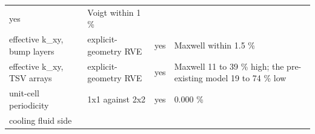 \documentclass[10pt,]{article}
\begin{document}
\begin{longtable}[]{@{}llll@{}}
\begin{minipage}[t]{0.22\columnwidth}
yes\strut
\end{minipage} & \begin{minipage}[t]{0.22\columnwidth}\raggedright
Voigt within 1 \%\strut
\end{minipage}\tabularnewline
\begin{minipage}[t]{0.22\columnwidth}\raggedright
effective k\_xy, bump layers\strut
\end{minipage} & \begin{minipage}[t]{0.22\columnwidth}\raggedright
explicit-geometry RVE\strut
\end{minipage} & \begin{minipage}[t]{0.22\columnwidth}\raggedright
yes\strut
\end{minipage} & \begin{minipage}[t]{0.22\columnwidth}\raggedright
Maxwell within 1.5 \%\strut
\end{minipage}\tabularnewline
\begin{minipage}[t]{0.22\columnwidth}\raggedright
effective k\_xy, TSV arrays\strut
\end{minipage} & \begin{minipage}[t]{0.22\columnwidth}\raggedright
explicit-geometry RVE\strut
\end{minipage} & \begin{minipage}[t]{0.22\columnwidth}\raggedright
yes\strut
\end{minipage} & \begin{minipage}[t]{0.22\columnwidth}\raggedright
Maxwell 11 to 39 \% high; the pre-existing model 19 to 74 \% low\strut
\end{minipage}\tabularnewline
\begin{minipage}[t]{0.22\columnwidth}\raggedright
unit-cell periodicity\strut
\end{minipage} & \begin{minipage}[t]{0.22\columnwidth}\raggedright
1x1 against 2x2\strut
\end{minipage} & \begin{minipage}[t]{0.22\columnwidth}\raggedright
yes\strut
\end{minipage} & \begin{minipage}[t]{0.22\columnwidth}\raggedright
0.000 \%\strut
\end{minipage}\tabularnewline
\begin{minipage}[t]{0.22\columnwidth}\raggedright
cooling fluid side\strut
\end{minipage} & \begin{minipage}[t]{0.22\columnwidth}\raggedright

\end{minipage}
\end{longtable}
\end{document}
